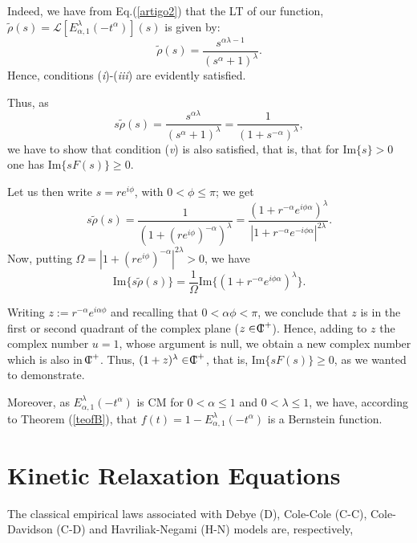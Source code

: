 \documentclass[12pt]{amsart}
\newcommand{\cplex}{{\rm I\hspace{-6pt}C}}
\numberwithin{equation}{section}
\begin{document}
Indeed, we have from Eq.(\ref{artigo2}) that the LT of our function, 
	$\tilde{\rho}(s)=\mathscr{L}[E_{\alpha,1}^{\lambda}(-t^{\alpha})](s)$
	is given by:
\begin{equation} \tilde{\rho}(s)=
\frac{s^{\alpha\lambda-1}}{(s^{\alpha}+1)^\lambda}.
\label{laplacexi}
\end{equation} 
Hence, conditions ({\emph{i}})-({\emph{iii}}) are evidently satisfied.

Thus, as 
\begin{equation}
s\tilde{\rho}(s)=\frac{s^{\alpha\lambda}}{(s^{\alpha}+1)^{\lambda}}=\frac{1}{(1+s^{-\alpha})^{\lambda}},
\end{equation} 
we have to show that condition ({\emph{v}}) is also satisfied, that is, that for Im$\{s\} > 0$
one has $\mbox{Im}\{sF(s)\}\geq 0$.
	
Let us then write $s=re^{i\phi}$, with $0<\phi\leq \pi$; we get 
\begin{equation}
s\tilde{\rho}(s)=\frac{1}{(1+(re^{i
\phi})^{-\alpha})^{\lambda}}=\frac{(1+r^{-\alpha}e^{i\phi\alpha})^{\lambda}}{|1+r^{-\alpha}e^{-i\phi
\alpha}|^{2\lambda}}. 
\end{equation}
Now, putting $\Omega=|1+(re^{i\phi})^{-\alpha}|^{2\lambda}>0$, we have
\begin{equation}
\mbox{Im}\{s\tilde{\rho}(s)\}=\frac{1}{\Omega}\mbox{Im}\{(1+r^{-\alpha}e^{i\phi\alpha})^{\lambda}\}.
\end{equation}
		
Writing $z:=r^{-\alpha}e^{i\alpha\phi}$ and recalling that $0<\alpha\phi<\pi$, we conclude that
$z$ is in the first or second quadrant of the complex plane ($z \in \cplex^{+}$). Hence, adding
to $z$ the complex number $u=1$, whose argument is null, we obtain a new complex number which is
also in $\cplex^{+}$. Thus, $(1+z)^\lambda \in \cplex^{+}$, that is, Im$\{sF(s)\} \geq 0$, as we
wanted to demonstrate. 

Moreover, as $E_{\alpha,1}^{\lambda}(-t^\alpha)$ is CM for $0<\alpha\leq1$ and $0<\lambda\leq1$,
we have, according to Theorem (\ref{teofB}), that $f(t)=1-E_{\alpha,1}^{\lambda}(-t^\alpha)$ is a
Bernstein function. 


\section{Kinetic Relaxation Equations}
		
The classical empirical laws associated with Debye (D), Cole-Cole (C-C),
Cole-Davidson (C-D) and Havriliak-Negami (H-N) models are, respectively, 
\end{document}
